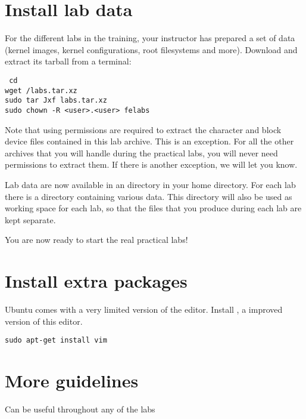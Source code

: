 
\section{Install lab data}

For the different labs in the training, your instructor has prepared a
set of data (kernel images, kernel configurations, root filesystems
and more). Download and extract its tarball from a terminal:


{\small
{\tt
cd \\
wget \sessionurl/labs.tar.xz \\
sudo tar Jxf labs.tar.xz \\
sudo chown -R <user>.<user> felabs \\
}
}

Note that using  permissions are required to extract the
character and block device files contained in this lab archive. This is
an exception. For all the other archives that you will handle during 
the practical labs, you will never need  permissions to
extract them. If there is another exception, we will let you know.

Lab data are now available in an  directory in your home
directory. For each lab there is a directory containing various
data. This directory will also be used as working space for each lab,
so that the files that you produce during each lab are kept separate.

You are now ready to start the real practical labs!

\section{Install extra packages}

Ubuntu comes with a very limited version of the 
editor. Install , a improved version of this editor.

\begin{verbatim}
sudo apt-get install vim
\end{verbatim}

\section{More guidelines}

Can be useful throughout any of the labs

